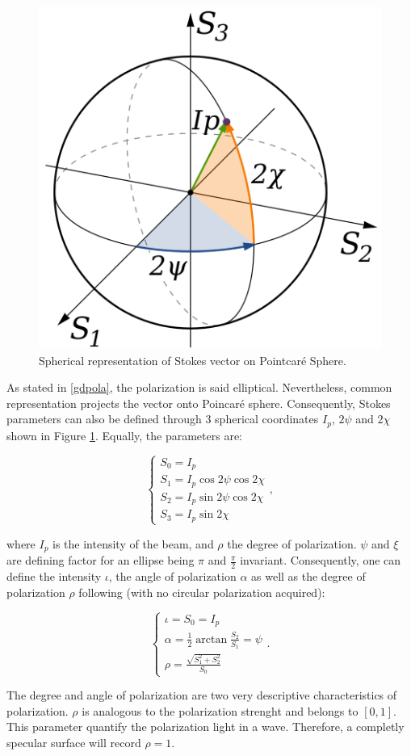 \begin{figure}[h]
	\centering
	\includegraphics[width=0.3\linewidth]{Figures/Preliminary/pointcare}
	\caption{Spherical representation of Stokes vector on Pointcar\'e Sphere.}
	\label{fig:pointcare}
\end{figure}

As stated in \ref{gdpola}, the polarization is said elliptical. Nevertheless, common representation projects the vector onto Poincar\'e sphere. Consequently, Stokes parameters can also be defined through 3 spherical coordinates $I_p$, $2\psi$ and $2\chi$ shown in Figure \ref{fig:pointcare}. Equally, the parameters are:

\begin{equation}
	\begin{cases}
	S_0 = I_p \\
	S_1 =  I_p \cos 2\psi \cos 2\chi\\
	S_2 =  I_p \sin 2\psi \cos 2\chi\\
	S_3 =  I_p \sin 2 \chi
	\end{cases},
\end{equation}

where $I_p$ is the intensity of the beam, and $\rho$ the degree of polarization. $\psi$ and $\xi$ are defining factor for an ellipse being $\pi$ and $\frac{\pi}{2}$ invariant.
Consequently, one can define the intensity $\iota$, the angle of polarization $\alpha$ as well as the degree of polarization $\rho$ following (with no circular polarization acquired): 

\begin{equation}
\begin{cases}
\iota = S_0 =  I_p \\[8pt] 
\alpha = \frac{1}{2} \arctan \frac{S_2}{S_1}  = \psi\\[8pt] 
\rho =  \frac{\sqrt{S_1^2 + S_2^2}}{S_0}
\end{cases}.
\end{equation}

The degree and angle of polarization are two very descriptive characteristics of polarization. $\rho$ is analogous to the polarization strenght and belongs to $\left[0,1\right]$. This parameter quantify the polarization light in a wave. Therefore, a completly specular surface will record $\rho = 1$.

